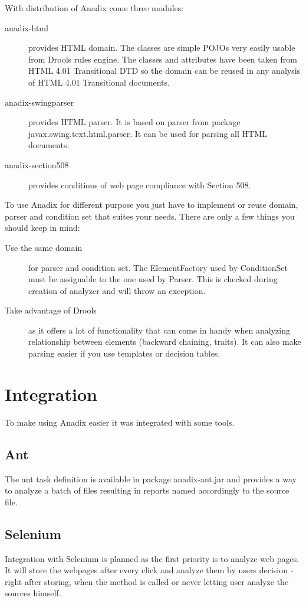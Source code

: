 \documentclass{report}
\begin{document}
With distribution of Anadix come three modules:
\begin{description}
  \item[anadix-html] provides HTML domain. The classes are simple POJOs very
  easily usable from Drools rules engine. The classes and attributes have been
  taken from HTML 4.01 Transitional DTD so the domain can be reused in any
  analysis of HTML 4.01 Transitional documents.
  \item[anadix-swingparser] provides HTML parser. It is based on parser from
  package javax.swing.text.html.parser. It can be used for parsing all HTML
  documents.
  \item[anadix-section508] provides conditions of web page compliance with
  Section 508.
\end{description}

To use Anadix for different purpose you just have to implement or reuse domain,
parser and condition set that suites your needs. There are only a few things you
should keep in mind:
\begin{description}
  \item[Use the same domain] for parser and condition set. The ElementFactory
  used by ConditionSet must be assignable to the one used by Parser. This is
  checked during creation of analyzer and will throw an exception.
  \item[Take advantage of Drools] as it offers a lot of functionality that can
  come in handy when analyzing relationship between elements (backward
  chaining, traits). It can also make parsing easier if you use templates or
  decision tables.
\end{description}

\chapter{Integration}
To make using Anadix easier it was integrated with some tools.
\section{Ant}
The ant task definition is available in package anadix-ant.jar and provides a
way to analyze a batch of files resulting in reports named accordingly to the
source file.

\section*{Selenium}
Integration with Selenium is planned as the first priority is to analyze web
pages. It will store the webpages after every click and analyze them by users
decision - right after storing, when the method is called or never letting user
analyze the sources himself.
\end{document}
